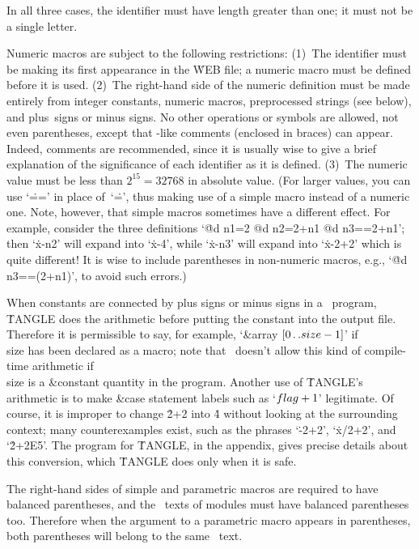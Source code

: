 \yskip\noindent In all three cases, the identifier must have length greater
than one; it must not be a single letter.

Numeric macros are subject to the following restrictions:\quad
(1)~The identifier must
be making its first appearance in the \.{WEB} file;
a numeric macro must be defined before it is used.\quad
(2)~The right-hand side of the numeric definition must be made entirely from
integer constants, numeric macros, preprocessed strings (see below), and
plus~signs or minus signs.  No other operations or symbols are allowed,
not even parentheses, except that \PASCAL-like comments (enclosed in
braces) can appear. Indeed, comments are recommended, since it is usually
wise to give a brief explanation of the significance of each identifier as
it is defined.\quad
(3)~The numeric value must be less than $2^{15}=32768$ in absolute value.
(For larger values, you can use `\.{==}' in place of~`\.=', thus making use
of a simple macro instead of a numeric one. Note, however, that simple
macros sometimes have a different effect. For example, consider the three
definitions `\.{@d n1=2 @d n2=2+n1 @d n3==2+n1}'; then `\.{x-n2}' will
expand into `\.{x-4}', while `\.{x-n3}' will expand into `\.{x-2+2}' which
is quite different! It is wise to include parentheses in non-numeric
macros, e.g., `\.{@d n3==(2+n1)}', to avoid such errors.)

When constants are connected by plus signs or minus
signs in a \PASCAL\ program, \.{TANGLE} does the arithmetic before putting
the constant into the output file. Therefore it is permissible to say, for
example, `\&{array} $[0\,.\,.\,\\{size}-1]$' if \\{size} has been declared
as a macro; note that \PASCAL\ doesn't allow this kind of compile-time
arithmetic if \\{size} is a \&{constant} quantity in the program. Another
use of \.{TANGLE}'s arithmetic is to make \&{case} statement labels such
as `$\\{flag}+1$' legitimate. Of course, it is improper to change \.{2+2}
into \.4 without looking at the surrounding context; many counterexamples
exist, such as the phrases `\.{-2+2}', `\.{x/2+2}', and `\.{2+2E5}'.  The
program for \.{TANGLE}, in the appendix, gives precise details about this
conversion, which \.{TANGLE} does only when it is safe.

The right-hand sides of simple and parametric macros
are required to have balanced parentheses, and the \PASCAL\ texts of
modules must have balanced parentheses too. Therefore when the argument
to a para\-metric macro appears in parentheses, both parentheses
will belong to the same \PASCAL\ text.

